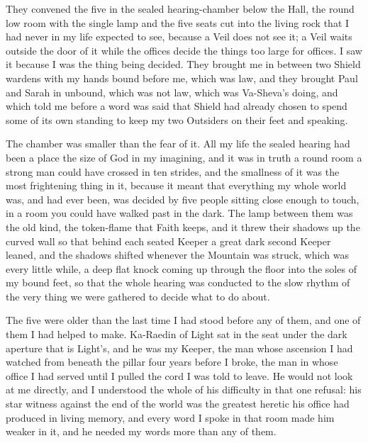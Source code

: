 
They convened the five in the sealed hearing-chamber below the Hall, the round low room with the single lamp and the five seats cut into the living rock that I had never in my life expected to see, because a Veil does not see it; a Veil waits outside the door of it while the offices decide the things too large for offices. I saw it because I was the thing being decided. They brought me in between two Shield wardens with my hands bound before me, which was law, and they brought Paul and Sarah in unbound, which was not law, which was Va-Sheva's doing, and which told me before a word was said that Shield had already chosen to spend some of its own standing to keep my two Outsiders on their feet and speaking.\par

The chamber was smaller than the fear of it. All my life the sealed hearing had been a place the size of God in my imagining, and it was in truth a round room a strong man could have crossed in ten strides, and the smallness of it was the most frightening thing in it, because it meant that everything my whole world was, and had ever been, was decided by five people sitting close enough to touch, in a room you could have walked past in the dark. The lamp between them was the old kind, the token-flame that Faith keeps, and it threw their shadows up the curved wall so that behind each seated Keeper a great dark second Keeper leaned, and the shadows shifted whenever the Mountain was struck, which was every little while, a deep flat knock coming up through the floor into the soles of my bound feet, so that the whole hearing was conducted to the slow rhythm of the very thing we were gathered to decide what to do about.\par

The five were older than the last time I had stood before any of them, and one of them I had helped to make. Ka-Raedin of Light sat in the seat under the dark aperture that is Light's, and he was my Keeper, the man whose ascension I had watched from beneath the pillar four years before I broke, the man in whose office I had served until I pulled the cord I was told to leave. He would not look at me directly, and I understood the whole of his difficulty in that one refusal: his star witness against the end of the world was the greatest heretic his office had produced in living memory, and every word I spoke in that room made him weaker in it, and he needed my words more than any of them.\par


